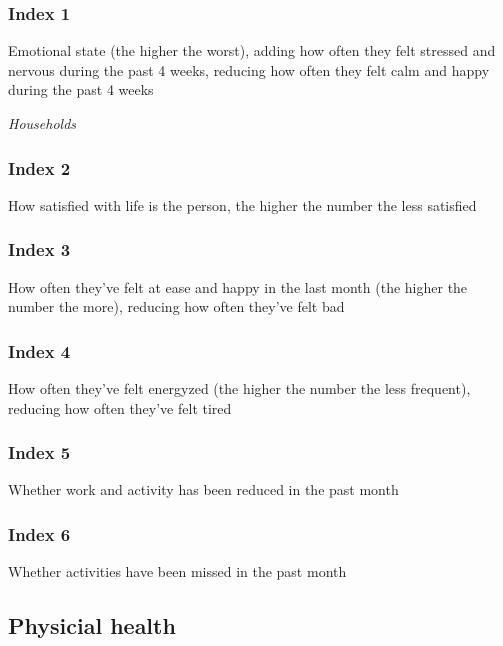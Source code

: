 \subsubsection{Index 1}
Emotional state (the higher the worst), adding how often they felt stressed and nervous during the past 4 weeks, reducing how often they felt calm and happy during the past 4 weeks

\textit{Households}


\subsubsection{Index 2}
How satisfied with life is the person, the higher the number the less satisfied


\subsubsection{Index 3}
How often they've felt at ease and happy in the last month (the higher the number the more), reducing how often they've felt bad


\subsubsection{Index 4}
How often they've felt energyzed (the higher the number the less frequent), reducing how often they've felt tired 


\subsubsection{Index 5}
Whether work and activity has been reduced in the past month


\subsubsection{Index 6}
Whether activities have been missed in the past month

\subsection{Physicial health} 




